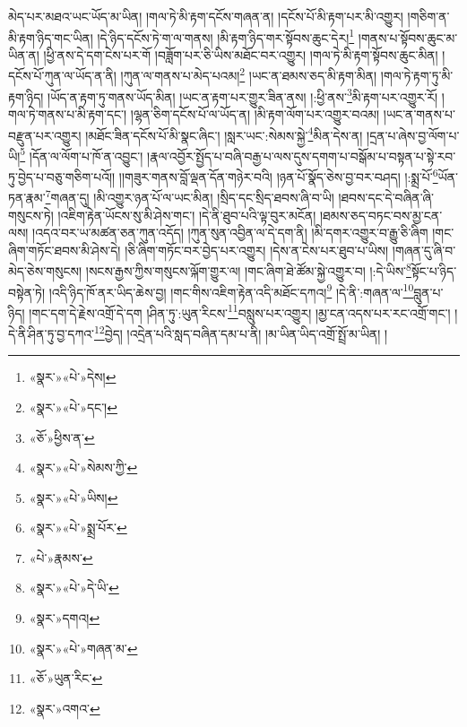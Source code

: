 མེད་པར་མཐའ་ཡང་ཡོད་མ་ཡིན། །གལ་ཏེ་མི་རྟག་དངོས་གཞན་ན། །དངོས་པོ་མི་རྟག་པར་མི་འགྱུར། །གཅིག་ན་མི་རྟག་ཉིད་གང་ཡིན། །དེ་ཉིད་དངོས་ཏེ་ག་ལ་གནས། །མི་རྟག་ཉིད་གར་སྟོབས་ཆུང་དེར།\footnote{«སྣར་»«པེ་»དེས།} །གནས་པ་སྟོབས་ཆུང་མ་ཡིན་ན། །ཕྱི་ནས་དེ་དག་ངེས་པར་གོ །བཟློག་པར་ཅི་ཡིས་མཐོང་བར་འགྱུར། །གལ་ཏེ་མི་རྟག་སྟོབས་ཆུང་མིན། །དངོས་པོ་ཀུན་ལ་ཡོད་ན་ནི། །ཀུན་ལ་གནས་པ་མེད་པའམ།\footnote{«སྣར་»«པེ་»དང་།} །ཡང་ན་ཐམས་ཅད་མི་རྟག་མིན། །གལ་ཏེ་རྟག་ཏུ་མི་རྟག་ཉིད། །ཡོད་ན་རྟག་ཏུ་གནས་ཡོད་མིན། །ཡང་ན་རྟག་པར་གྱུར་ཟིན་ནས། །:ཕྱི་ནས་\footnote{«ཅོ་»ཕྱིས་ན་}མི་རྟག་པར་འགྱུར་རོ། །གལ་ཏེ་གནས་པ་མི་རྟག་དང་། །ལྷན་ཅིག་དངོས་པོ་ལ་ཡོད་ན། །མི་རྟག་ལོག་པར་འགྱུར་བའམ། །ཡང་ན་གནས་པ་བརྫུན་པར་འགྱུར། །མཐོང་ཟིན་དངོས་པོ་མི་སྣང་ཞིང་། །སླར་ཡང་:སེམས་སྐྱེ་\footnote{«སྣར་»«པེ་»སེམས་ཀྱི་}མིན་དེས་ན། །དྲན་པ་ཞེས་བྱ་ལོག་པ་ཡི།\footnote{«སྣར་»«པེ་»ཡིས།} །དོན་ལ་ལོག་པ་ཁོ་ན་འབྱུང་། །རྣལ་འབྱོར་སྤྱོད་པ་བཞི་བརྒྱ་པ་ལས་དུས་དགག་པ་བསྒོམ་པ་བསྟན་པ་སྟེ་རབ་ཏུ་བྱེད་པ་བཅུ་གཅིག་པའོ།། །།གཟུར་གནས་བློ་ལྡན་དོན་གཉེར་བའི། །ཉན་པོ་སྣོད་ཅེས་བྱ་བར་བཤད། །:སྨྲ་པོ་\footnote{«སྣར་»«པེ་»སྨྲ་པོར་}ཡོན་ཏན་རྣམ་\footnote{«པེ་»རྣམས་}གཞན་དུ། །མི་འགྱུར་ཉན་པོ་ལ་ཡང་མིན། །སྲིད་དང་སྲིད་ཐབས་ཞི་བ་ཡི། །ཐབས་དང་དེ་བཞིན་ཞི་གསུངས་ཏེ། །འཇིག་རྟེན་ཡོངས་སུ་མི་ཤེས་གང་། །དེ་ནི་ཐུབ་པའི་ལྟ་བུར་མངོན། །ཐམས་ཅད་བཏང་བས་མྱ་ངན་ལས། །འདའ་བར་ཡ་མཚན་ཅན་ཀུན་འདོད། །ཀུན་སུན་འབྱིན་ལ་དེ་དག་ནི། །མི་དགར་འགྱུར་བ་རྒྱུ་ཅི་ཞིག །གང་ཞིག་གཏོང་ཐབས་མི་ཤེས་དེ། །ཅི་ཞིག་གཏོང་བར་བྱེད་པར་འགྱུར། །དེས་ན་ངེས་པར་ཐུབ་པ་ཡིས། །གཞན་དུ་ཞི་བ་མེད་ཅེས་གསུངས། །སངས་རྒྱས་ཀྱིས་གསུངས་ལྐོག་གྱུར་ལ། །གང་ཞིག་ཐེ་ཚོམ་སྐྱེ་འགྱུར་བ། །:དེ་ཡིས་\footnote{«སྣར་»«པེ་»དེ་ཡི་}སྟོང་པ་ཉིད་བསྟེན་ཏེ། །འདི་ཉིད་ཁོ་ནར་ཡིད་ཆེས་བྱ། །གང་གིས་འཇིག་རྟེན་འདི་མཐོང་དཀའ།\footnote{«སྣར་»དགའ།} །དེ་ནི་:གཞན་ལ་\footnote{«སྣར་»«པེ་»གཞན་མ་}བླུན་པ་ཉིད། །གང་དག་དེ་རྗེས་འགྲོ་དེ་དག །ཤིན་ཏུ་:ཡུན་རིངས་\footnote{«ཅོ་»ཡུན་རིང་}བསླུས་པར་འགྱུར། །མྱ་ངན་འདས་པར་རང་འགྲོ་གང་། །དེ་ནི་ཤིན་ཏུ་བྱ་དཀའ་\footnote{«སྣར་»འགའ་}བྱེད། །འདྲེན་པའི་སླད་བཞིན་དམ་པ་ནི། །མ་ཡིན་ཡིད་འགྲོ་སྤྲོ་མ་ཡིན། །
